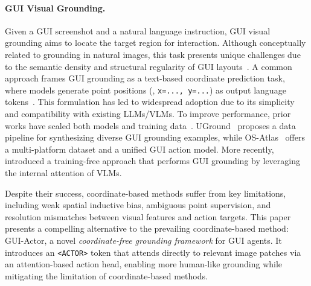 \paragraph{GUI Visual Grounding.}
Given a GUI screenshot and a natural language instruction, GUI visual grounding aims to locate the target region for interaction.
Although conceptually related to grounding in natural images, this task presents unique challenges due to the semantic density and structural regularity of GUI layouts~\citep{cheng2024seeclick, gou2024navigating}. A common approach frames GUI grounding as a text-based coordinate prediction task, where models generate point positions (\eg, \texttt{x=..., y=...}) as output language tokens~\citep{chen2023shikra, wang2024qwen2}. This formulation has led to widespread adoption due to its simplicity and compatibility with existing LLMs/VLMs. To improve performance, prior works have scaled both models and training data~\citep{lin2024showui, yang2024aria, pawlowski2024tinyclick, tang2025think, bai2025qwen2, qin2025ui, xie2025scaling}. UGround~\citep{gou2024navigating} proposes a data pipeline for synthesizing diverse GUI grounding examples, while OS-Atlas~\citep{wu2024atlas} offers a multi-platform dataset and a unified GUI action model. More recently, \citet{xu2025attention} introduced a training-free approach that performs GUI grounding by leveraging the internal attention of VLMs.

Despite their success, coordinate-based methods suffer from key limitations,
including weak spatial inductive bias, ambiguous point supervision, and resolution mismatches between visual features and action targets.
This paper presents a compelling alternative to the prevailing coordinate-based method: GUI-Actor, a novel \textit{coordinate-free grounding framework} for GUI agents.
It introduces an \texttt{<ACTOR>} token that attends directly to relevant image patches via an attention-based action head, enabling more human-like grounding while mitigating the limitation of coordinate-based methods.




